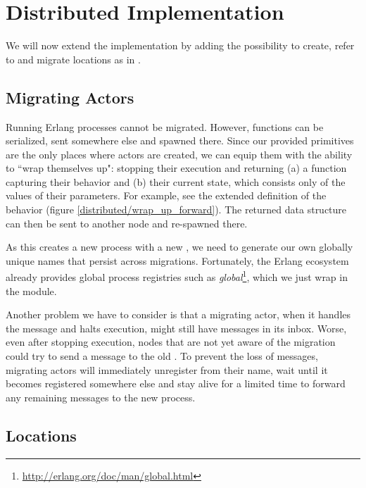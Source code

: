 \section{Distributed Implementation}

We will now extend the implementation by adding the possibility to
create, refer to and migrate locations as in \distjoincalc.


\subsection{Migrating Actors}
\label{ch_migration}

Running Erlang processes cannot be migrated.
However, functions can be serialized, sent somewhere else and spawned there.
Since our provided primitives are the only places where actors are created,
we can equip them with the ability to ``wrap themselves up":
stopping their execution and returning
(a) a function capturing their behavior and
(b) their current state, which consists only of the values of their parameters.
For example, see the extended definition of the  behavior
(figure \ref{distributed/wrap_up_forward}).
The returned data structure can then be sent to another node
and re-spawned there.


As this creates a new process with a new \PID,
we need to generate our own globally unique names
that persist across migrations.
Fortunately, the Erlang ecosystem already provides global process registries
such as \emph{global}\footnote{\url{http://erlang.org/doc/man/global.html}},
which we just wrap in the  module.

Another problem we have to consider is that a migrating actor,
when it handles the  message and halts execution,
might still have messages in its inbox.
Worse, even after stopping execution,
nodes that are not yet aware of the migration
could try to send a message to the old \PID.
To prevent the loss of messages, migrating actors will immediately unregister
from their name, wait until it becomes registered somewhere else
and stay alive for a limited time to forward any remaining messages
to the new process.


\subsection{Locations}

